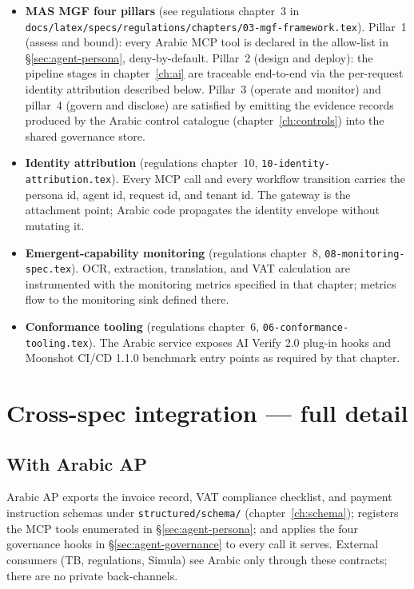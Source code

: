 \documentclass[11pt,a4paper,twoside]{report}
\begin{document}
\begin{itemize}
\item \textbf{MAS MGF four pillars} (see regulations
chapter~3 in \texttt{docs/latex/specs/regulations/chapters/03-mgf-framework.tex}).
Pillar~1 (assess and bound): every Arabic MCP tool is declared in
the allow-list in \S\ref{sec:agent-persona}, deny-by-default.
Pillar~2 (design and deploy): the pipeline stages in
chapter~\ref{ch:ai} are traceable end-to-end via the
per-request identity attribution described below. Pillar~3
(operate and monitor) and pillar~4 (govern and disclose) are
satisfied by emitting the evidence records produced by the
Arabic control catalogue (chapter~\ref{ch:controls}) into the
shared governance store.
\item \textbf{Identity attribution} (regulations chapter~10,
\texttt{10-identity-attribution.tex}). Every MCP call and every
workflow transition carries the persona id, agent id, request
id, and tenant id. The gateway is the attachment point; Arabic
code propagates the identity envelope without mutating it.
\item \textbf{Emergent-capability monitoring} (regulations
chapter~8, \texttt{08-monitoring-spec.tex}). OCR, extraction,
translation, and VAT calculation are instrumented with the
monitoring metrics specified in that chapter; metrics flow to
the monitoring sink defined there.
\item \textbf{Conformance tooling} (regulations chapter~6,
\texttt{06-conformance-tooling.tex}). The Arabic service exposes
AI Verify 2.0 plug-in hooks and Moonshot CI/CD 1.1.0 benchmark
entry points as required by that chapter.
\end{itemize}

\section{Cross-spec integration --- full detail}
\label{sec:agent-integration}

\subsection{With Arabic AP}
Arabic AP exports the invoice record, VAT compliance checklist, and
payment instruction schemas under \texttt{structured/schema/}
(chapter~\ref{ch:schema}); registers the MCP tools enumerated in
\S\ref{sec:agent-persona}; and applies the four governance hooks in
\S\ref{sec:agent-governance} to every call it serves. External
consumers (TB, regulations, Simula) see Arabic only through these
contracts; there are no private back-channels.
\end{document}
